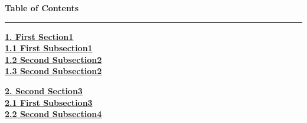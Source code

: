 \begin{center}
  {\large\bfseries Table of Contents}
\end{center}
\hrule
\vspace{1cm}

\noindent\hyperref[sec:first]{\textbf{\large 1. First Section}}\dotfill\hyperref[sec:first]{\textbf{\large 1}}\\[0.3cm]
    \hspace*{0.5cm}\hyperref[sub:first]{\textbf{1.1 First Subsection}}\dotfill\hyperref[sub:first]{\textbf{1}}\\ [0.2cm]
    \hspace*{0.5cm}\hyperref[sub:second]{\textbf{1.2 Second Subsection}}\dotfill\hyperref[sub:second]{\textbf{2}}\\ [0.2cm]
    \hspace*{0.5cm}\hyperref[sub:ola]{\textbf{1.3 Second Subsection}}\dotfill\hyperref[sub:ola]{\textbf{2}}\\ 
\vspace{0.3cm}

\noindent\hyperref[sec:second]{\textbf{\large 2. Second Section}}\dotfill\hyperref[sec:second]{\textbf{\large 3}}\\[0.3cm]
    \hspace*{0.5cm}\hyperref[sub:third]{\textbf{2.1 First Subsection}}\dotfill\hyperref[sub:third]{\textbf{3}}\\ [0.2cm]
    \hspace*{0.5cm}\hyperref[sub:fourth]{\textbf{2.2 Second Subsection}}\dotfill\hyperref[sub:fourth]{\textbf{4}}\\ [0.2cm]
\vspace{0.3cm}

\setcounter{page}{1}

\newpage